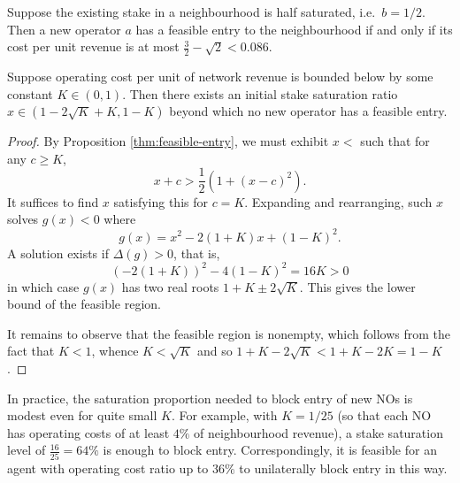 \begin{example}

  Suppose the existing stake in a neighbourhood is half saturated, i.e.~$b=1/2$.
  Then a new operator $a$ has a feasible entry to the neighbourhood if and only if its cost per unit revenue is at most $\frac{3}{2}-\sqrt{2}< 0.086$.

\end{example}

\begin{corollary}
  \label{thm:entry-blocking-ratio}

  Suppose operating cost per unit of network revenue is bounded below by some constant $K\in(0,1)$.
  Then there exists an initial stake saturation ratio $x\in(1-2\sqrt{K}+K,1-K)$ beyond which no new operator has a feasible entry.

\end{corollary}
%
\begin{proof}

  By Proposition \ref{thm:feasible-entry}, we must exhibit $x<$ such that for any $c\geq K$,
  \[
    x + c > \frac{1}{2}(1 + (x-c)^2).
  \]
  It suffices to find $x$ satisfying this for $c=K$.
  Expanding and rearranging, such $x$ solves $g(x)<0$ where
  \[
    g(x) = x^2 - 2(1+K) x + (1-K)^2.
  \]
  A solution exists if $\Delta(g)>0$, that is,
  \[
    (-2(1+K))^2 - 4(1-K)^2  = 16K > 0
  \]
  in which case $g(x)$ has two real roots $1 + K \pm 2\sqrt{K}$.
  This gives the lower bound of the feasible region.
  
  It remains to observe that the feasible region is nonempty, which follows from the fact that $K<1$, whence $K<\sqrt{K}$ and so $1+K-2\sqrt{K}<1+K-2K=1-K$.\qedhere

\end{proof}

\begin{example}

  In practice, the saturation proportion needed to block entry of new NOs is modest even for quite small $K$.
  For example, with $K=1/25$ (so that each NO has operating costs of at least $4\%$ of neighbourhood revenue), a stake saturation level of $\frac{16}{25}=64\%$ is enough to block entry.
  Correspondingly, it is feasible for an agent with operating cost ratio up to $36\%$ to unilaterally block entry in this way.

\end{example}


